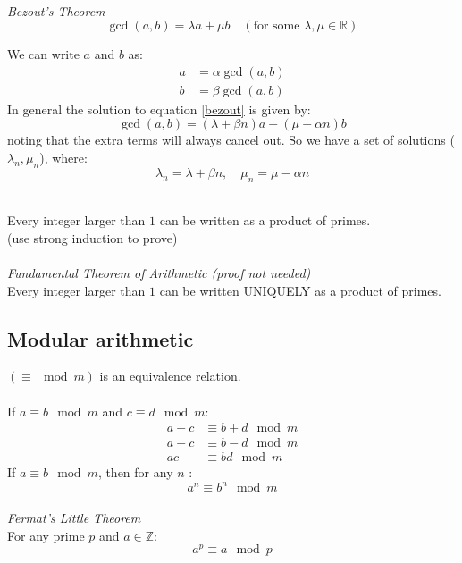 \documentclass{scrartcl}
\newcommand{\R}{\mathbb{R}}
\newcommand{\Z}{\mathbb{Z}}
\begin{document}
\noindent
\\
\textit{Bezout's Theorem}
\begin{equation} \label{bezout}
\gcd(a, b) = \lambda a + \mu b \quad (\textrm{for some } \lambda, \mu \in \R)
\end{equation}
\begin{tcolorbox}[breakable]
We can write $ a $ and $ b $ as:
\begin{align}
a & = \alpha \gcd(a, b) \\
b & = \beta \gcd(a, b)
\end{align}
In general the solution to equation \ref{bezout} is given by:
\begin{equation}
\gcd(a, b) = (\lambda + \beta n) a + (\mu - \alpha n) b
\end{equation}
noting that the extra terms will always cancel out. So we have a set of solutions ($ \lambda_{n}, \mu_{n} $), where:
\begin{equation}
\lambda_{n} = \lambda + \beta n, \quad \mu_{n} = \mu - \alpha n
\end{equation}
\end{tcolorbox}
\noindent
\\
Every integer larger than $ 1 $ can be written as a product of primes.
\\
(use strong induction to prove)
\\\\
\textit{Fundamental Theorem of Arithmetic (proof not needed)}
\\
Every integer larger than $ 1 $ can be written UNIQUELY as a product of primes.

\subsection{Modular arithmetic}
$ (\equiv \mod m) $ is an equivalence relation.
\\\\
If $ a \equiv b \mod m $ and $ c \equiv d \mod m $:
\begin{align}
a + c & \equiv b + d \mod m \\
a - c & \equiv b - d \mod m \\
ac & \equiv bd \mod m
\end{align}
If $ a \equiv b \mod m $, then for any $ n $ :
\begin{equation}
a^{n} \equiv b^{n} \mod m
\end{equation}
\\
\textit{Fermat's Little Theorem}
\\
For any prime $ p $ and $ a \in \Z $:
\begin{equation}
a^{p} \equiv a \mod p
\end{equation}
\end{document}
